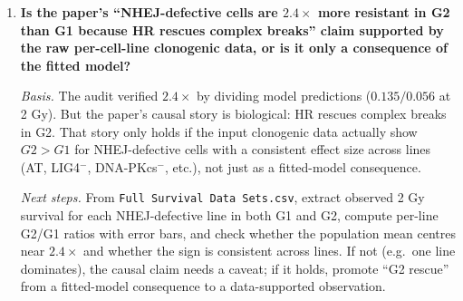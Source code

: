 \begin{enumerate}
\item \textbf{Is the paper's ``NHEJ-defective cells are $2.4\times$ more
      resistant in G2 than G1 because HR rescues complex breaks'' claim
      supported by the raw per-cell-line clonogenic data, or is it only
      a consequence of the fitted model?}

  \emph{Basis.} The audit verified $2.4\times$ by dividing model
  predictions ($0.135 / 0.056$ at 2 Gy). But the paper's causal story is
  biological: HR rescues complex breaks in G2. That story only holds if
  the input clonogenic data actually show $G2 > G1$ for NHEJ-defective
  cells with a consistent effect size across lines (AT, LIG4$^-$,
  DNA-PKcs$^-$, etc.), not just as a fitted-model consequence.

  \emph{Next steps.} From \texttt{Full Survival Data Sets.csv}, extract
  observed 2 Gy survival for each NHEJ-defective line in both G1 and G2,
  compute per-line G2/G1 ratios with error bars, and check whether the
  population mean centres near $2.4\times$ and whether the sign is
  consistent across lines. If not (e.g.\ one line dominates), the causal
  claim needs a caveat; if it holds, promote ``G2 rescue'' from a
  fitted-model consequence to a data-supported observation.

\end{enumerate}
